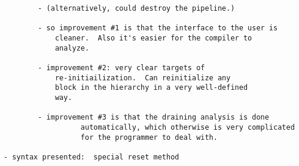 \begin{verbatim}
		- (alternatively, could destroy the pipeline.)

		- so improvement #1 is that the interface to the user is 
			cleaner.  Also it's easier for the compiler to 
			analyze.

		- improvement #2: very clear targets of
			re-initiailization.  Can reinitialize any
			block in the hierarchy in a very well-defined
			way.

		- improvement #3 is that the draining analysis is done
                  automatically, which otherwise is very complicated
                  for the programmer to deal with.

- syntax presented:  special reset method

\end{verbatim}







